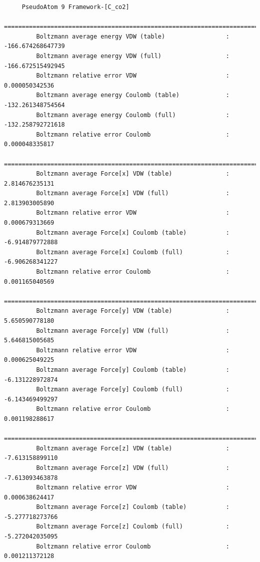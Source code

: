 \begin{tiny}
\begin{verbatim}
     PseudoAtom 9 Framework-[C_co2]
     =========================================================================================
         Boltzmann average energy VDW (table)                 :  -166.674268647739
         Boltzmann average energy VDW (full)                  :  -166.672515492945
         Boltzmann relative error VDW                         :     0.000050342536
         Boltzmann average energy Coulomb (table)             :  -132.261348754564
         Boltzmann average energy Coulomb (full)              :  -132.258792721618
         Boltzmann relative error Coulomb                     :     0.000048335817
     =========================================================================================
         Boltzmann average Force[x] VDW (table)               :     2.814676235131
         Boltzmann average Force[x] VDW (full)                :     2.813903005890
         Boltzmann relative error VDW                         :     0.000679313669
         Boltzmann average Force[x] Coulomb (table)           :    -6.914879772888
         Boltzmann average Force[x] Coulomb (full)            :    -6.906268341227
         Boltzmann relative error Coulomb                     :     0.001165040569
     =========================================================================================
         Boltzmann average Force[y] VDW (table)               :     5.650590778180
         Boltzmann average Force[y] VDW (full)                :     5.646815005685
         Boltzmann relative error VDW                         :     0.000625049225
         Boltzmann average Force[y] Coulomb (table)           :    -6.131228972874
         Boltzmann average Force[y] Coulomb (full)            :    -6.143469499297
         Boltzmann relative error Coulomb                     :     0.001198288617
     =========================================================================================
         Boltzmann average Force[z] VDW (table)               :    -7.613158899110
         Boltzmann average Force[z] VDW (full)                :    -7.613093463878
         Boltzmann relative error VDW                         :     0.000638624417
         Boltzmann average Force[z] Coulomb (table)           :    -5.277718273766
         Boltzmann average Force[z] Coulomb (full)            :    -5.272042035095
         Boltzmann relative error Coulomb                     :     0.001211372128
     

\end{verbatim}
\end{tiny}
